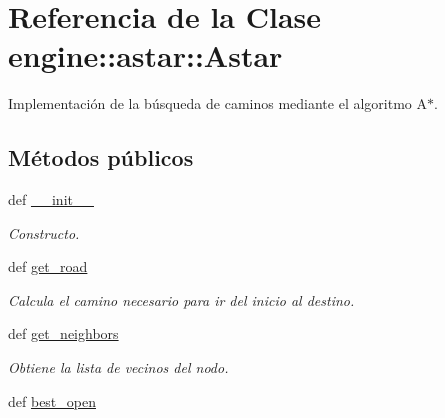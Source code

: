 \hypertarget{classengine_1_1astar_1_1Astar}{
\section{\-Referencia de la \-Clase engine\-:\-:astar\-:\-:\-Astar}
\label{classengine_1_1astar_1_1Astar}
}


\-Implementación de la búsqueda de caminos mediante el algoritmo \-A$\ast$.  


\subsection*{\-Métodos públicos}
\begin{DoxyCompactItemize}
\item 
def \hyperlink{classengine_1_1astar_1_1Astar_a0197e336487e626b19e32d0448dbe4cc}{\-\_\-\-\_\-init\-\_\-\-\_\-}
\begin{DoxyCompactList}\small\item\em \-Constructo. \end{DoxyCompactList}\item 
def \hyperlink{classengine_1_1astar_1_1Astar_a2ff53d014fe6028aec897eda78f4afc6}{get\-\_\-road}
\begin{DoxyCompactList}\small\item\em \-Calcula el camino necesario para ir del inicio al destino. \end{DoxyCompactList}\item 
def \hyperlink{classengine_1_1astar_1_1Astar_a36f12da73b9b2b41229906d76088f6e2}{get\-\_\-neighbors}
\begin{DoxyCompactList}\small\item\em \-Obtiene la lista de vecinos del nodo. \end{DoxyCompactList}\item 
\hypertarget{classengine_1_1astar_1_1Astar_aa15cf13c907eb55c34baaffa18815ca7}{
def \hyperlink{classengine_1_1astar_1_1Astar_aa15cf13c907eb55c34baaffa18815ca7}{best\-\_\-open}}
\label{classengine_1_1astar_1_1Astar_aa15cf13c907eb55c34baaffa18815ca7}


\end{DoxyCompactItemize}
